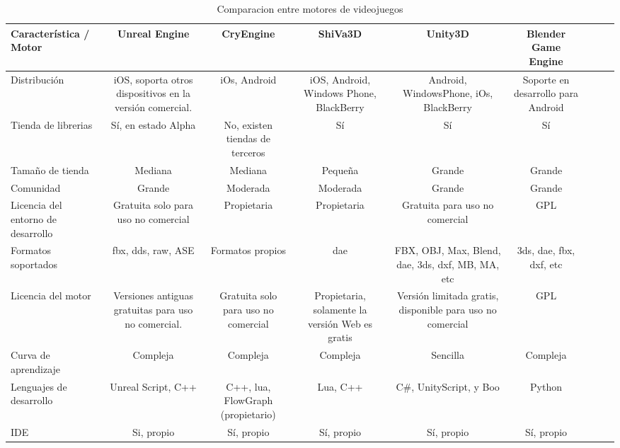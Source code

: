 

\begin{sidewaystable}
\begin{tabulary}{\textwidth}{L|CCCCCCCC}
\toprule
Característica / Motor &
Unreal Engine          &
CryEngine              &
ShiVa3D                &
Unity3D                &
Blender Game Engine \\
\midrule
Distribución & iOS, soporta otros dispositivos en la versión comercial. &
iOs, Android & iOS, Android, Windows Phone, BlackBerry & Android, WindowsPhone,
iOs, BlackBerry & Soporte en desarrollo para Android \\ 

Tienda de librerias & Sí, en estado Alpha & No, existen tiendas de
terceros & Sí & Sí & Sí \\

Tamaño de tienda & Mediana & Mediana & Pequeña & Grande & Grande \\

Comunidad & Grande & Moderada & Moderada & Grande & Grande \\
Licencia del entorno de desarrollo & Gratuita solo para uso no comercial &
Propietaria & Propietaria & Gratuita para uso no comercial & GPL \\

Formatos soportados & fbx, dds, raw, ASE & Formatos propios & dae & FBX, OBJ,
Max, Blend, dae, 3ds, dxf, MB, MA, etc & 3ds, dae, fbx, dxf, etc \\

Licencia del motor & Versiones antiguas gratuitas para uso no comercial.
& Gratuita solo para uso no comercial & Propietaria, solamente la versión Web es
gratis & Versión limitada gratis, disponible para uso no comercial & GPL \\

Curva de aprendizaje & Compleja & Compleja & Compleja & Sencilla & Compleja \\

Lenguajes de desarrollo & Unreal Script, C++ & C++, lua, FlowGraph
(propietario) & Lua, C++ & C\#, UnityScript, y Boo & Python \\

IDE & Si, propio & Sí, propio & Sí, propio & Sí, propio & Sí, propio \\
\bottomrule

\end{tabulary}
\caption{Comparacion entre motores de videojuegos}
\label{tab:comparacion_motores_juegos}
\end{sidewaystable}

